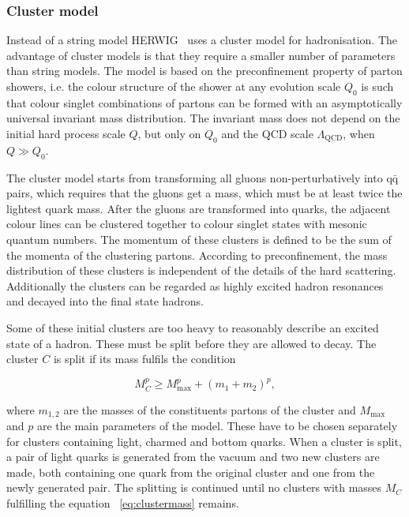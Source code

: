 \subsubsection*{Cluster model}
Instead of a string model HERWIG~\cite{herwigManual} uses a cluster model for hadronisation. The advantage of cluster models is that they require a smaller number of parameters than string models. The model is based on the preconfinement property of parton showers, i.e. the colour structure of the shower at any evolution scale $Q_0$ is such that colour singlet combinations of partons can be formed with an asymptotically 
universal invariant mass distribution. The invariant mass does not depend on the initial hard process scale $Q$, but only on $Q_0$ and the QCD scale $\Lambda _ \mathrm{QCD}$, when $Q \gg Q_0$.

The cluster model starts from transforming all gluons non-perturbatively into $\mathrm{q \bar q}$ pairs, which requires that the gluons get a mass, which must be at least twice the lightest quark mass. After the gluons are transformed into quarks, the adjacent colour lines can be clustered together to colour singlet states with mesonic quantum numbers. The momentum of these clusters is defined to be the sum of the momenta of the clustering partons. According to preconfinement, the mass distribution of these clusters is independent of the details of the hard scattering. Additionally the clusters can be regarded as highly excited hadron resonances and decayed into the final state hadrons.

Some of these initial clusters are too heavy to reasonably describe an excited state of a hadron. These must be
split before they are allowed to decay. The cluster $C$ is split if its mass fulfils the condition~\cite{missing}

\begin{equation}
M_C^p \geq M_\mathrm{max}^p  + \left( m_1 + m_2\right)^p,
\label{eq:clustermass}
\end{equation}

\noindent where $m_{1,2}$ are the masses of the constituents partons of the cluster and $M_\mathrm{max}$ and $p$ are the main parameters of the model. These have to be chosen separately for clusters containing light, charmed and bottom quarks. When a cluster is split, a pair of light quarks is generated from the vacuum and two new clusters are made, both containing one quark from the original cluster and one from the newly generated pair. The splitting is continued until no clusters with masses $M_C$ fulfilling the equation ~\ref{eq:clustermass} remains.

